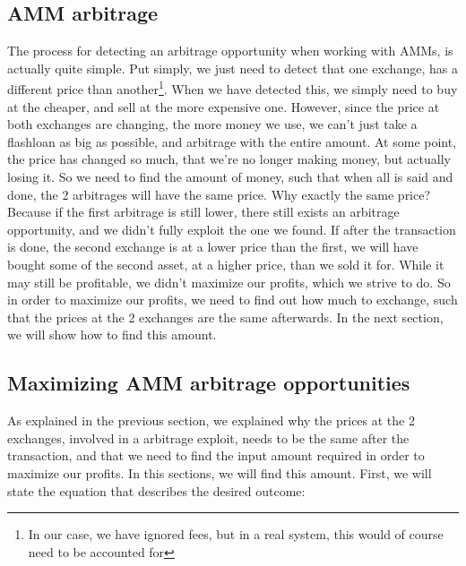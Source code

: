 \subsection{AMM arbitrage}
The process for detecting an arbitrage opportunity when working with AMMs, is
actually quite simple. Put simply, we just need to detect that one exchange, has
a different price than another\footnote{In our case, we have ignored fees, but
in a real system, this would of course need to be accounted for}. When we have
detected this, we simply need to buy at the cheaper, and sell at the more
expensive one. However, since the price at both exchanges are changing, the more
money we use, we can't just take a flashloan as big as possible, and arbitrage
with the entire amount. At some point, the price has changed so much, that we're
no longer making money, but actually losing it. So we need to find the amount of
money, such that when all is said and done, the 2 arbitrages will have the same
price. Why exactly the same price? Because if the first arbitrage is still
lower, there still exists an arbitrage opportunity, and we didn't fully exploit
the one we found. If after the transaction is done, the second exchange is at a
lower price than the first, we will have bought some of the second asset, at a
higher price, than we sold it for. While it may still be profitable, we didn't
maximize our profits, which we strive to do. So in order to maximize our
profits, we need to find out how much to exchange, such that the prices at the 2
exchanges are the same afterwards. In the next section, we will show how to find
this amount.

\subsection{Maximizing AMM arbitrage opportunities}
As explained in the previous section, we explained why the prices at the 2
exchanges, involved in a arbitrage exploit, needs to be the same after the
transaction, and that we need to find the input amount required in order to
maximize our profits. In this sections, we will find this amount. First, we will
state the equation that describes the desired outcome:

